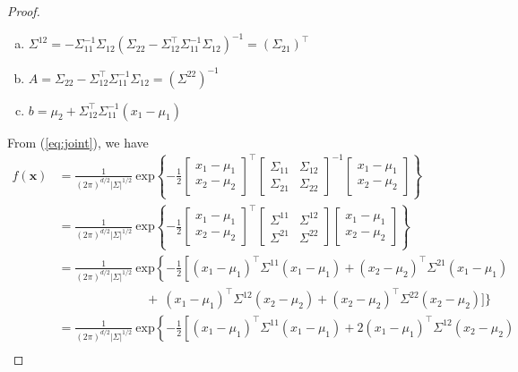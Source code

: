 \documentclass[twoside,11pt]{homework}
\DeclarePairedDelimiter{\2norm}{\lVert}{\rVert^2_2}
\newcommand{\1}[1]{\mathds{1}\left[#1\right]}
\begin{document}
\begin{proof}
\begin{enumerate}[a.)]
\item $\Sigma^{12}  = - \Sigma_{11}^{-1}\Sigma_{12}\left(\Sigma_{22} - \Sigma_{12}^{\top}\Sigma_{11}^{-1}\Sigma_{12}\right)^{-1} = \left(\Sigma_{21}\right)^{\top}  $

\item  $ A = \Sigma_{22} - \Sigma_{12}^{\top}\Sigma_{11}^{-1}\Sigma_{12}  =  (\Sigma^{22})^{-1}$

\item $ b = \mu_2 + \Sigma_{12}^{\top}\Sigma_{11}^{-1}(x_1 - \mu_1)$
\end{enumerate}
From (\ref{eq:joint}), we have
\begin{align*}
f(\textbf{x}) & = \frac{1}{(2\pi)^{d/2}|\Sigma|^{1/2}} \ \text{exp} \left\lbrace -\frac{1}{2}\begin{bmatrix} x_1 - \mu_1 \\ x_2 - \mu_2 \end{bmatrix}^{\top} \begin{bmatrix} \Sigma_{11} & \Sigma_{12} \\ \Sigma_{21} & \Sigma_{22} \end{bmatrix}^{-1} \begin{bmatrix} x_1 - \mu_1 \\ x_2 - \mu_2 \end{bmatrix} \right\rbrace \\
& = \frac{1}{(2\pi)^{d/2}|\Sigma|^{1/2}} \ \text{exp} \left\lbrace -\frac{1}{2}\begin{bmatrix} x_1 - \mu_1 \\ x_2 - \mu_2 \end{bmatrix}^{\top} \begin{bmatrix} \Sigma^{11} & \Sigma^{12} \\ \Sigma^{21} & \Sigma^{22} \end{bmatrix} \begin{bmatrix} x_1 - \mu_1 \\ x_2 - \mu_2 \end{bmatrix} \right\rbrace  \\
& = \frac{1}{(2\pi)^{d/2}|\Sigma|^{1/2}} \ \text{exp} \left\lbrace -\frac{1}{2} \left[(x_1 - \mu_1)^{\top}\Sigma^{11}(x_1-\mu_1)  +  (x_2 - \mu_2)^{\top}\Sigma^{21}(x_1-\mu_1) \right. \right. \\[1em]
&\quad  \ \ \ \ \ \ \ \ \ \ \ \ \ \ \ \ \ \ \ \ \ \ \ \ \ \ \ + \ (x_1 - \mu_1)^{\top}\Sigma^{12}(x_2-\mu_2) + (x_2 - \mu_2)^{\top}\Sigma^{22}(x_2-\mu_2)\Big] \Bigg\} \\[1em]
& = \frac{1}{(2\pi)^{d/2}|\Sigma|^{1/2}} \ \text{exp} \left\lbrace -\frac{1}{2} \left[(x_1 - \mu_1)^{\top}\Sigma^{11}(x_1-\mu_1)  +  2(x_1 - \mu_1)^{\top}\Sigma^{12}(x_2-\mu_2) \right. \right. \\[1em]

\end{align*}
\end{proof}
\end{document}
